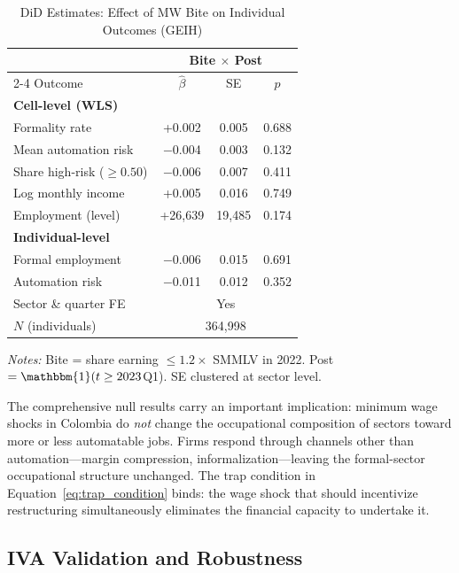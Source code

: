 \documentclass[a4paper,fleqn]{cas-sc}
\begin{document}
\begin{table}[htbp]
\centering
\begin{threeparttable}
\caption{DiD Estimates: Effect of MW Bite on Individual Outcomes (GEIH)}
\label{tab:geih_results}
\begin{tabular}{lccc}
\toprule
& \multicolumn{3}{c}{Bite $\times$ Post} \\
\cmidrule{2-4}
Outcome & $\hat{\beta}$ & SE & $p$ \\
\midrule
\textbf{Cell-level (WLS)} & & & \\
\quad Formality rate & +0.002 & 0.005 & 0.688 \\
\quad Mean automation risk & $-$0.004 & 0.003 & 0.132 \\
\quad Share high-risk ($\geq 0.50$) & $-$0.006 & 0.007 & 0.411 \\
\quad Log monthly income & +0.005 & 0.016 & 0.749 \\
\quad Employment (level) & +26,639 & 19,485 & 0.174 \\
\textbf{Individual-level} & & & \\
\quad Formal employment & $-$0.006 & 0.015 & 0.691 \\
\quad Automation risk & $-$0.011 & 0.012 & 0.352 \\
\midrule
Sector \& quarter FE & \multicolumn{3}{c}{Yes} \\
$N$ (individuals) & \multicolumn{3}{c}{364,998} \\
\bottomrule
\end{tabular}
\begin{tablenotes}
\small
\item \textit{Notes:} Bite = share earning $\leq 1.2\times$ SMMLV in 2022. Post $= \mathbbm{1}(t \geq 2023$Q1). SE clustered at sector level.
\end{tablenotes}
\end{threeparttable}
\end{table}

The comprehensive null results carry an important implication: minimum wage shocks in Colombia do \emph{not} change the occupational composition of sectors toward more or less automatable jobs. Firms respond through channels other than automation---margin compression, informalization---leaving the formal-sector occupational structure unchanged. The trap condition in Equation~\eqref{eq:trap_condition} binds: the wage shock that should incentivize restructuring simultaneously eliminates the financial capacity to undertake it.

\subsection{IVA Validation and Robustness}
\label{subsec:results_iva}
\end{document}
